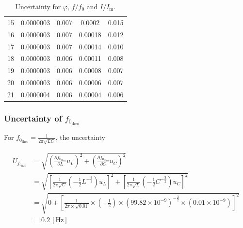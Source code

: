 \documentclass{article}
\begin{document}
\begin{table}[H]
\begin{tabular}{ccccc}
        15 & 0.0000003   & 0.007              & 0.0002                                  & 0.015                                 \\
        16 & 0.0000003   & 0.007              & 0.00018                                 & 0.012                                 \\
        17 & 0.0000003   & 0.007              & 0.00014                                 & 0.010                                 \\
        18 & 0.0000003   & 0.006              & 0.00011                                 & 0.008                                 \\
        19 & 0.0000003   & 0.006              & 0.00008                                 & 0.007                                 \\
        20 & 0.0000003   & 0.006              & 0.00006                                 & 0.007                                 \\
        21 & 0.0000004   & 0.006              & 0.00004                                 & 0.006                                 \\
        \bottomrule
    \end{tabular}
    \caption{Uncertainty for $\varphi$, $f/f_0$ and $I/I_\text{m}$.}\label{TableUnc}
\end{table}

\subsubsection*{Uncertainty of $f_{0_{\text{theo}}}$}

For $f_{0_\text{{theo}}} = \frac{1}{2\pi\sqrt{LC}}$, the uncertainty

\begin{align*}
    U_{f_{0_{\text{theo}}}} & = \sqrt{(\frac{\partial f_{0_{\text{theo}}}}{\partial L}u_L)^2 + (\frac{\partial f_{0_{\text{theo}}}}{\partial C}u_C)^2}                                                                     \\
                            & = \sqrt{\left[\frac{1}{2 \pi \sqrt{C}}\left(-\frac{1}{2} L^{-\frac{3}{2}}\right) u_{L}\right]^{2}+\left[\frac{1}{2 \pi \sqrt{L}}\left(-\frac{1}{2} C^{-\frac{3}{2}}\right) u_{C}\right]^{2}} \\
                            & = \sqrt{0+\left[\frac{1}{2 \pi \times \sqrt{0.01}} \times\left(-\frac{1}{2}\right) \times\left(99.82 \times 10^{-9}\right)^{-\frac{3}{2}} \times\left(0.01 \times 10^{-9}\right)\right]^{2}} \\
                            & = 0.2 \,[\text{Hz}]
\end{align*}
\end{document}
